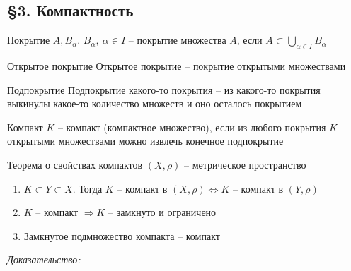 \documentclass[12pt]{article}
\begin{document}
\subsection{\S 3. Компактность}

\begin{defin}{Покрытие}
    $A, B_\alpha$. $B_\alpha,\ \alpha \in I$ -- покрытие множества $A$, если $A \subset \bigcup\limits_{\alpha \in I} B_\alpha$
\end{defin}

\begin{defin}{Открытое покрытие}
    Открытое покрытие -- покрытие открытыми множествами
\end{defin}

\begin{defin}{Подпокрытие}
    Подпокрытие какого-то покрытия -- из какого-то покрытия выкинулы какое-то количество множеств и оно осталось покрытием
\end{defin}

\begin{defin}{Компакт}
    $K$ -- компакт (компактное множество), если из любого покрытия $K$ открытыми множествами можно извлечь конечное подпокрытие 
\end{defin}

\begin{theo}{Теорема о свойствах компактов}
    $(X, \rho)$ -- метрическое пространство

    \begin{enumerate}
        \item $K \subset Y \subset X$. Тогда $K$ -- компакт в $(X, \rho) \Leftrightarrow K$ -- компакт в $(Y, \rho)$
        \item $K$ -- компакт $\Rightarrow K$ -- замкнуто и ограничено
        \item Замкнутое подмножество компакта -- компакт
    \end{enumerate}
\end{theo}

\newpage

\textit{Доказательство:}
\end{document}
